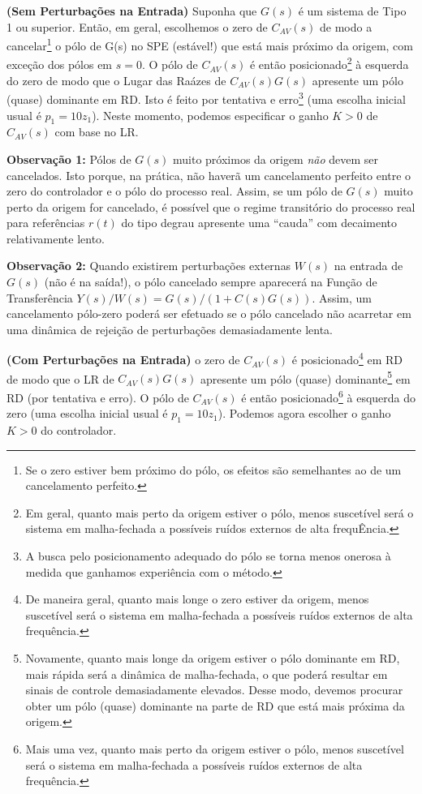 \documentclass[
]{book}
\theoremstyle{definition}
\theoremstyle{definition}
\theoremstyle{definition}
\theoremstyle{remark}
\begin{document}
\textbf{(Sem Perturbações na Entrada)} Suponha que \(G(s)\) é um sistema de Tipo 1 ou superior. Então, em geral, escolhemos o zero de \(C_{AV}(s)\) de modo a cancelar\footnote{Se o zero estiver bem próximo do pólo, os efeitos são semelhantes ao de um cancelamento perfeito.} o pólo de G(s) no SPE (estável!) que está mais próximo da origem, com exceção dos pólos em \(s = 0\). O pólo de \(C_{AV}(s)\) é então posicionado\footnote{Em geral, quanto mais perto da origem estiver o pólo, menos suscetível será o sistema em malha-fechada a possíveis ruídos externos de alta frequÊncia.} à esquerda do zero de modo que o Lugar das Raázes de \(C_{AV}(s)G(s)\) apresente um pólo (quase) dominante em RD. Isto é feito por tentativa e erro\footnote{A busca pelo posicionamento adequado do pólo se torna menos onerosa à medida que ganhamos experiência com o método.} (uma escolha inicial usual é \(p_1 = 10z_1\)). Neste momento, podemos especificar o ganho \(K > 0\) de \(C_{AV}(s)\) com base no LR.

\textbf{Observação 1:} Pólos de \(G(s)\) muito próximos da origem \emph{não} devem ser cancelados. Isto porque, na prática, não haverã um cancelamento perfeito entre o zero do controlador e o pólo do processo real. Assim, se um pólo de \(G(s)\) muito perto da origem for cancelado, é possível que o regime transitório do processo real para referências \(r(t)\) do tipo degrau apresente uma ``cauda'' com decaimento relativamente lento.

\textbf{Observação 2:} Quando existirem perturbações externas \(W(s)\) na entrada de \(G(s)\) (não é na saída!), o pólo cancelado sempre aparecerá na Função de Transferência \(Y(s)/W(s) = G(s)/(1+C(s)G(s))\). Assim, um cancelamento pólo-zero poderá ser efetuado se o pólo cancelado não acarretar em uma dinâmica de rejeição de perturbações demasiadamente lenta.

\textbf{(Com Perturbações na Entrada)} o zero de \(C_{AV}(s)\) é posicionado\footnote{De maneira geral, quanto mais longe o zero estiver da origem, menos suscetível será o sistema em malha-fechada a possíveis ruídos externos de alta frequência.} em RD de modo que o LR de \(C_{AV}(s)G(s)\) apresente um pólo (quase) dominante\footnote{Novamente, quanto mais longe da origem estiver o pólo dominante em RD, mais rápida será a dinâmica de malha-fechada, o que poderá resultar em sinais de controle demasiadamente elevados. Desse modo, devemos procurar obter um pólo (quase) dominante na parte de RD que está mais próxima da origem.} em RD (por tentativa e erro). O pólo de \(C_{AV}(s)\) é então posicionado\footnote{Mais uma vez, quanto mais perto da origem estiver o pólo, menos suscetível será o sistema em malha-fechada a possíveis ruídos externos de alta frequência.} à esquerda do zero (uma escolha inicial usual é \(p_1 = 10z_1\)). Podemos agora escolher o ganho \(K>0\) do controlador.
\end{document}
